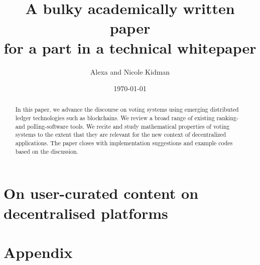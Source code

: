 

\usepackage{listings}
\usepackage{color}
\usepackage{enumitem}
\usepackage{amsmath}
\usepackage{bm}
\usepackage{hyperref}




\title{A bulky academically written paper\\ for a part in a technical whitepaper} %
\author{Alexa and Nicole Kidman}
\date{\today} %


\maketitle %

\begin{abstract}
In this paper, we advance the discourse on voting systems using emerging distributed ledger technologies such as blockchains. 
We review a broad range of existing ranking- and polling-software tools. 
We recite and study mathematical properties of voting systems to the extent that they are relevant for the new context of decentralized applications. 
The paper closes with implementation suggestions and example codes based on the discussion.
\end{abstract}

\tableofcontents \newpage

\part{On user-curated content on decentralised platforms} 

 
  \newpage
  \newpage
 \newpage
 \newpage
 \newpage
  

\part{Appendix} 

\cite{voting}
\cite{voting2}
\cite{voting3}
\cite{voting4}
\cite{picture}
\cite{video}

\printbibliography[filter=literature]

\printbibliography[heading=subbibliography, filter={others}, title={Further Resources}]

\printbibliography[heading=subbibliography, keyword=Bild, title={Picture Resources}]

\nocite{Picture2}

